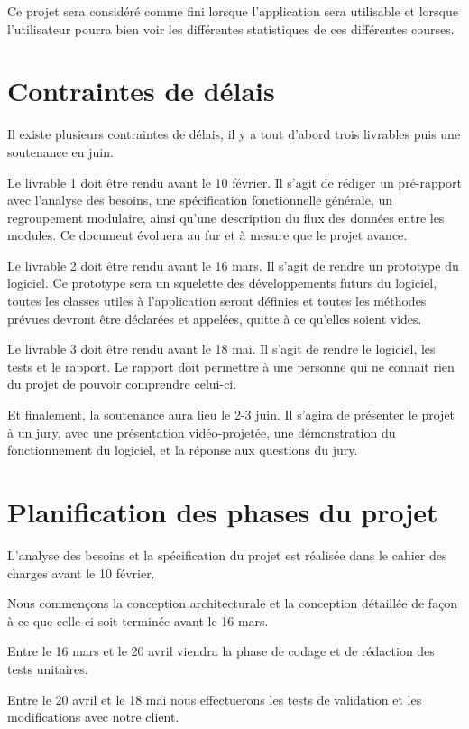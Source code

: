 Ce projet sera considéré comme fini lorsque l’application sera utilisable et lorsque l’utilisateur pourra bien voir les différentes statistiques de ces différentes courses.

\section{Contraintes de délais}

Il existe plusieurs contraintes de délais, il y a tout d'abord trois livrables puis une soutenance en juin.

Le livrable 1 doit être rendu avant le 10 février. Il s'agit de rédiger un pré-rapport avec l'analyse des besoins, une spécification fonctionnelle générale, un regroupement modulaire, ainsi qu'une description du flux des données entre les modules. Ce document évoluera au fur et à mesure que le projet avance.

Le livrable 2 doit être rendu avant le 16 mars. Il s'agit de rendre un prototype du logiciel. Ce prototype sera un squelette des développements futurs du logiciel, toutes les classes utiles à l'application seront définies et toutes les méthodes prévues devront être déclarées et appelées, quitte à ce qu'elles soient vides.

Le livrable 3 doit être rendu avant le 18 mai. Il s'agit de rendre le logiciel, les tests et le rapport. Le rapport doit permettre à une personne qui ne connait rien du projet de pouvoir comprendre celui-ci.

Et finalement, la soutenance aura lieu le 2-3 juin. Il s'agira de présenter le projet à un jury, avec une présentation vidéo-projetée, une démonstration du fonctionnement du logiciel, et la réponse aux questions du jury.

\section{Planification des phases du projet}

L'analyse des besoins et la spécification du projet est réalisée dans le cahier des charges avant le 10 février.

Nous commençons la conception architecturale et la conception détaillée de façon à ce que celle-ci soit terminée avant le 16 mars.

Entre le 16 mars et le 20 avril viendra la phase de codage et de rédaction des tests unitaires.

Entre le 20 avril et le 18 mai nous effectuerons les tests de validation et les modifications avec notre client.